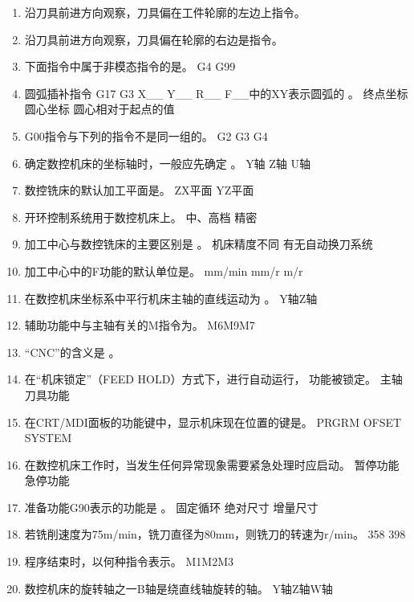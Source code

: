 \documentclass[12pt,twocolumn,landscape,UTF8,twoside,fontset=windows]{ctexart}%
\begin{document}
\begin{enumerate} [1.]
	\item 沿刀具前进方向观察，刀具偏在工件轮廓的左边上指令。
	\item 沿刀具前进方向观察，刀具偏在轮廓的右边是指令。
	\item 下面指令中属于非模态指令的是。
	      	{G4}	{G99}
	\item 圆弧插补指令 G17 G3 X\_\_ Y\_\_ R\_\_ F\_\_中的XY表示圆弧的	。
	      	{终点坐标}	{圆心坐标}	{圆心相对于起点的值}
	\item G00指令与下列的指令不是同一组的。
	      		{G2}	{G3}	{G4}
	\item 确定数控机床的坐标轴时，一般应先确定	。
	      	{Y轴} {Z轴}		{U轴}
	\item 数控铣床的默认加工平面是。
	      		{ZX平面}		{YZ平面}
	\item 开环控制系统用于数控机床上。
	      		{中、高档}		{精密}
	\item 加工中心与数控铣床的主要区别是	。
	      	{机床精度不同}	{有无自动换刀系统}
	\item 加工中心中的F功能的默认单位是。
	      	{mm/min}	{mm/r}	{m/r}
	\item 在数控机床坐标系中平行机床主轴的直线运动为	。
	      	{Y轴}{Z轴}
	\item 辅助功能中与主轴有关的M指令为。
	       {M6}{M9}{M7}
	\item “CNC”的含义是	。
	\item 在“机床锁定”（FEED HOLD）方式下，进行自动运行，	功能被锁定。
	      	{主轴} {刀具功能}
	\item 在CRT/MDI面板的功能键中，显示机床现在位置的键是。
	      	{PRGRM}	{OFSET}	{SYSTEM}
	\item 在数控机床工作时，当发生任何异常现象需要紧急处理时应启动。
	      	{暂停功能}	{急停功能}
	\item 准备功能G90表示的功能是	。
	      	{固定循环}	{绝对尺寸}	{增量尺寸}
	\item 若铣削速度为75m/min，铣刀直径为80mm，则铣刀的转速为r/min。
	      	{358}	{398}
	\item 程序结束时，以何种指令表示。
	      	{M1}{M2}{M3}
	\item 数控机床的旋转轴之一B轴是绕直线轴旋转的轴。
	      	{Y轴}{Z轴}{W轴}
\end{enumerate}
\end{document}
